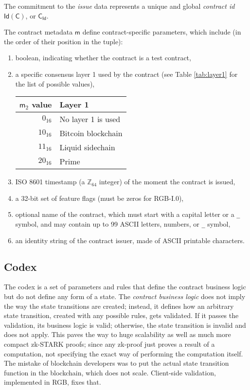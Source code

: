 \documentclass[9pt,oneside]{amsart}
\newenvironment{coltable}
  {\par\bigskip\noindent\minipage{\columnwidth}\centering}
  {\endminipage\par\bigskip}
\begin{document}
\newpage
\begin{multicols}{2}

The commitment to the \emph{issue} data represents a unique and global \emph{contract id}
$\mathsf{Id}(\mathsf{C})$, or $\mathsf{C_{Id}}$.

The contract metadata $\mathsf{m}$ define contract-specific parameters, which include
(in the order of their position in the tuple):

\begin{enumerate}
\item boolean, indicating whether the contract is a test contract,
\item a specific consensus layer 1 used by the contract
  (see Table \ref{tab:layer1} for the list of possible values),

\begin{coltable}
\label{tab:layer1}
\begin{tabular}{r l}
\toprule
$\mathsf{m}_2$ value & Layer 1 \\
\midrule
$0_{16}$ & No layer 1 is used \\
$10_{16}$ & Bitcoin blockchain \cite{Bitcoin} \\
$11_{16}$ & Liquid sidechain \cite{Liquid} \\
$20_{16}$ & Prime \cite{Prime} \\
\bottomrule
\end{tabular}
\end{coltable}

\item ISO 8601 timestamp (a $\mathbb{Z}_{64}$ integer) of the moment the contract is issued,
\item a 32-bit set of feature flags (must be zeros for RGB-I.0),
\item optional name of the contract, which must start with a capital letter or a \texttt{\_} symbol,
  and may contain up to 99 ASCII letters, numbers, or \texttt{\_} symbol,
\item an identity string of the contract issuer, made of ASCII printable characters.
\end{enumerate}

\subsection{Codex}\label{Codex}

The codex is a set of parameters and rules that define the contract business logic
but do not define any form of a state. The \emph{contract business logic} does not imply
the way the state transitions are created; instead, it defines how an arbitrary
state transition, created with any possible rules, gets validated. If it passes the validation,
its business logic is valid; otherwise, the state transition is invalid and does not apply.
This paves the way to huge scalability as well as much more compact zk-STARK proofs;
since any zk-proof just proves a result of a computation,
not specifying the exact way of performing the computation itself.
The mistake of blockchain developers was to put the actual state transition function in
the blockchain, which does not scale. Client-side validation, implemented in RGB, fixes that.


\end{multicols}
\end{document}
